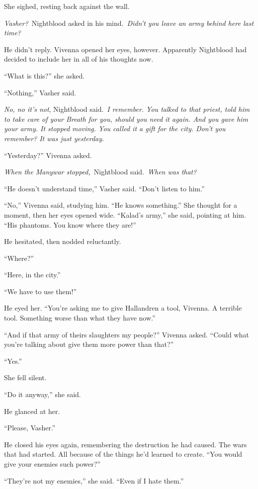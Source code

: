 She sighed, resting back against the wall.

\textit{Vasher?}~Nightblood asked in his mind.~\textit{Didn’t you leave an army behind here last time?}

He didn’t reply. Vivenna opened her eyes, however. Apparently Nightblood had decided to include her in all of his thoughts now.

“What is this?” she asked.

“Nothing,” Vasher said.

\textit{No, no it’s not}, Nightblood said.~\textit{I remember. You talked to that priest, told him to take care of your Breath for you, should you need it again. And you gave him your army. It stopped moving. You called it a gift for the city. Don’t you remember? It was just yesterday.}

“Yesterday?” Vivenna asked.

\textit{When the Manywar stopped,}~Nightblood said.~\textit{When was that?}

“He doesn’t understand time,” Vasher said. “Don’t listen to him.”

“No,” Vivenna said, studying him. “He knows something.” She thought for a moment, then her eyes opened wide. “Kalad’s army,” she said, pointing at him. “His phantoms. You know where they are!”

He hesitated, then nodded reluctantly.

“Where?”

“Here, in the city.”

“We have to use them!”

He eyed her. “You’re asking me to give Hallandren a tool, Vivenna. A terrible tool. Something worse than what they have now.”

“And if that army of theirs slaughters my people?” Vivenna asked. “Could what you’re talking about give them more power than that?”

“Yes.”

She fell silent.

“Do it anyway,” she said.

He glanced at her.

“Please, Vasher.”

He closed his eyes again, remembering the destruction he had caused. The wars that had started. All because of the things he’d learned to create. “You would give your enemies such power?”

“They’re not my enemies,” she said. “Even if I hate them.”

